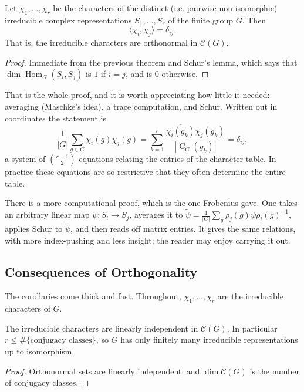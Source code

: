 \documentclass[a4paper]{scrartcl}
\newcommand{\Hom}{\operatorname{Hom}}
\newcommand{\Cent}{\operatorname{C}}
\newcommand{\ip}[2]{\langle #1, #2 \rangle}
\begin{document}
\begin{theorem}
	Let $\chi_1, \dots, \chi_r$ be the characters of the distinct (i.e. pairwise non-isomorphic) irreducible complex representations $S_1, \dots, S_r$ of the finite group $G$. Then
	$$\ip{\chi_i}{\chi_j} = \delta_{ij}.$$
	That is, the irreducible characters are orthonormal in $\mathcal{C}(G)$.
\end{theorem}
\begin{proof}
	Immediate from the previous theorem and Schur's lemma, which says that $\dim \Hom_G(S_i, S_j)$ is $1$ if $i=j$, and is $0$ otherwise.
\end{proof}

That is the whole proof, and it is worth appreciating how little it needed: averaging (Maschke's idea), a trace computation, and Schur. Written out in coordinates the statement is
$$\frac1{|G|}\sum_{g \in G}\overline{\chi_i(g)}\chi_j(g) = \sum_{k=1}^r \frac{\overline{\chi_i(g_k)}\chi_j(g_k)}{|\Cent_G(g_k)|} = \delta_{ij},$$
a system of $\binom{r+1}{2}$ equations relating the entries of the character table. In practice these equations are so restrictive that they often determine the entire table.

\begin{remark}
	There is a more computational proof, which is the one Frobenius gave. One takes an arbitrary linear map $\psi : S_i \to S_j$, averages it to $\tilde\psi = \frac1{|G|}\sum_g \rho_j(g)\psi\rho_i(g)^{-1}$, applies Schur to $\tilde\psi$, and then reads off matrix entries. It gives the same relations, with more index-pushing and less insight; the reader may enjoy carrying it out.
\end{remark}

\subsection{Consequences of Orthogonality}

The corollaries come thick and fast. Throughout, $\chi_1, \dots, \chi_r$ are the irreducible characters of $G$.

\begin{corollary}
	The irreducible characters are linearly independent in $\mathcal{C}(G)$. In particular $r \leq \#\{\text{conjugacy classes}\}$, so $G$ has only finitely many irreducible representations up to isomorphism.
\end{corollary}
\begin{proof}
	Orthonormal sets are linearly independent, and $\dim\mathcal{C}(G)$ is the number of conjugacy classes.
\end{proof}
\end{document}
